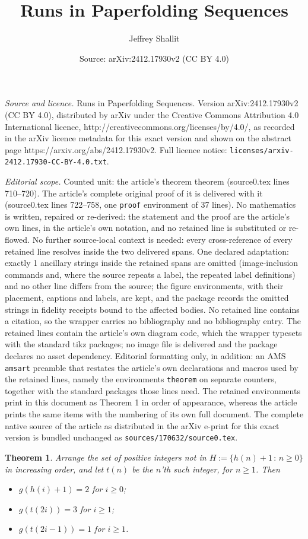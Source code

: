 \documentclass[10pt,a4paper]{amsart}
\title{Runs in Paperfolding Sequences}
\author{Jeffrey Shallit}
\date{Source: arXiv:2412.17930v2 (CC BY 4.0)}
\newtheorem{theorem}{Theorem}
\begin{document}
\maketitle

\noindent\emph{Source and licence.} Runs in Paperfolding Sequences. Version arXiv:2412.17930v2 (CC BY 4.0), distributed by arXiv under the Creative Commons Attribution 4.0 International licence, http://creativecommons.org/licenses/by/4.0/, as recorded in the arXiv licence metadata for this exact version and shown on the abstract page https://arxiv.org/abs/2412.17930v2. Full licence notice: \texttt{licenses/arxiv-2412.17930-CC-BY-4.0.txt}.\par\smallskip

\noindent\textit{Editorial scope.} Counted unit: the article's theorem theorem (source0.tex lines 710--720). The article's complete original proof of it is delivered with it (source0.tex lines 722--758, one \texttt{proof} environment of 37 lines). No mathematics is written, repaired or re-derived: the statement and the proof are the article's own lines, in the article's own notation, and no retained line is substituted or re-flowed.  No further source-local context is needed: every cross-reference of every retained line resolves inside the two delivered spans.  One declared adaptation: exactly 1 ancillary strings inside the retained spans are omitted (image-inclusion commands and, where the source repeats a label, the repeated label definitions) and no other line differs from the source; the figure environments, with their placement, captions and labels, are kept, and the package records the omitted strings in fidelity receipts bound to the affected bodies.  No retained line contains a citation, so the wrapper carries no bibliography and no bibliography entry.  The retained lines contain the article's own diagram code, which the wrapper typesets with the standard tikz packages; no image file is delivered and the package declares no asset dependency.  Editorial formatting only, in addition: an AMS \texttt{amsart} preamble that restates the article's own declarations and macros used by the retained lines, namely the environments \texttt{theorem} on separate counters, together with the standard packages those lines need.  The retained environments print in this document as Theorem 1 in order of appearance, whereas the article prints the same items with the numbering of its own full document.  The complete native source of the article as distributed in the arXiv e-print for this exact version is bundled unchanged as \texttt{sources/170632/source0.tex}.
\begin{theorem}
Arrange the set of positive integers
not in $H := \{ h(n)+1 \, : \, n \geq 0 \}$ in 
increasing order, and let $t(n)$ be the $n$'th such integer, for $n \geq 1$.
Then
\begin{itemize}
\item[(a)] $g(h(i)+1) = 2$ for $i \geq 0$;
\item[(b)] $g(t(2i)) = 3$ for $i \geq 1$;
\item[(c)] $g(t(2i-1)) = 1$ for $i \geq 1$.
\end{itemize}
\end{theorem}
\end{document}
